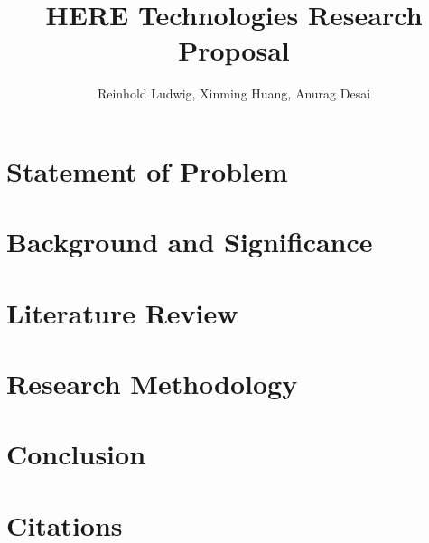 \documentclass{article}
\begin{document}
	\title{HERE Technologies Research Proposal}
	\author{Reinhold Ludwig, Xinming Huang, Anurag Desai}
	\maketitle
	\begin{abstract}
		
	\end{abstract}
	\section{Statement of Problem}
	
	\section{Background and Significance}
	
	\section{Literature Review}
	
	\section{Research Methodology}
	
	\section{Conclusion}
	
	\section{Citations}
	
\end{document}
